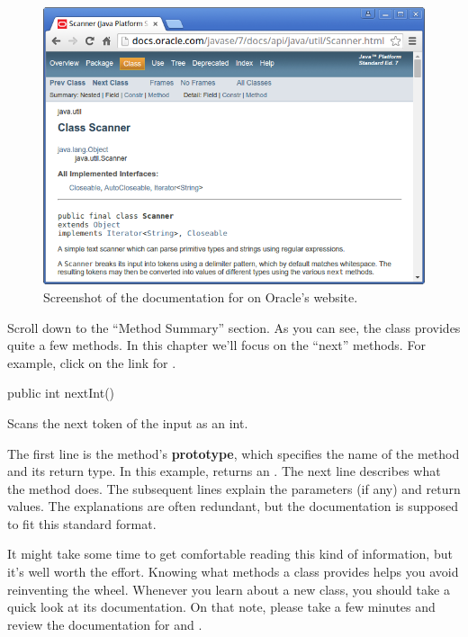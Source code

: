 \begin{figure}[h!]
\includegraphics[width=\textwidth]{scanner.png}
\caption{Screenshot of the documentation for  on Oracle's website.}
\end{figure}

Scroll down to the ``Method Summary'' section.
As you can see, the  class provides quite a few methods.
In this chapter we'll focus on the ``next'' methods.
For example, click on the link for .

\begin{stdout}
public int nextInt()

Scans the next token of the input as an int.
\end{stdout}


The first line is the method's {\bf prototype}, which specifies the name of the method and its return type.
In this example,  returns an .
The next line describes what the method does.
The subsequent lines explain the parameters (if any) and return values.
The explanations are often redundant, but the documentation is supposed to fit this standard format.

It might take some time to get comfortable reading this kind of information, but it's well worth the effort.
Knowing what methods a class provides helps you avoid reinventing the wheel.
Whenever you learn about a new class, you should take a quick look at its documentation.
On that note, please take a few minutes and review the documentation for  and .


